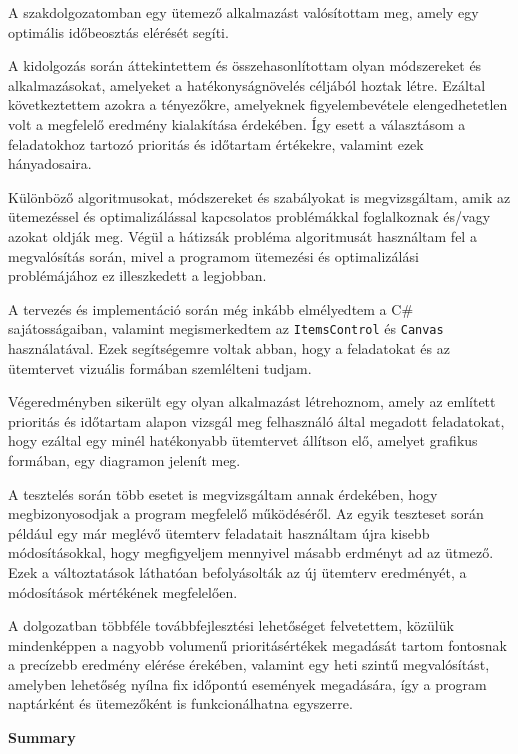 
A szakdolgozatomban egy ütemező alkalmazást valósítottam meg, amely egy optimális időbeosztás elérését segíti. 

A kidolgozás során áttekintettem és összehasonlítottam olyan módszereket és alkalmazásokat, amelyeket a hatékonyságnövelés céljából hoztak létre. Ezáltal következtettem azokra a tényezőkre, amelyeknek figyelembevétele elengedhetetlen volt a megfelelő eredmény kialakítása érdekében. Így esett a választásom a feladatokhoz tartozó prioritás és időtartam értékekre, valamint ezek hányadosaira.

Különböző algoritmusokat, módszereket és szabályokat is megvizsgáltam, amik az ütemezéssel és optimalizálással kapcsolatos problémákkal foglalkoznak és/vagy azokat oldják meg. Végül a hátizsák probléma algoritmusát használtam fel a megvalósítás során, mivel a programom ütemezési és optimalizálási problémájához ez illeszkedett a legjobban.

A tervezés és implementáció során még inkább elmélyedtem a C\# sajátosságaiban, valamint megismerkedtem az \texttt{ItemsControl} és \texttt{Canvas} használatával. Ezek segítségemre voltak abban, hogy a feladatokat és az ütemtervet vizuális formában szemlélteni tudjam.

Végeredményben sikerült egy olyan alkalmazást létrehoznom, amely az említett prioritás és időtartam alapon vizsgál meg felhasználó által megadott feladatokat, hogy ezáltal egy minél hatékonyabb ütemtervet állítson elő, amelyet grafikus formában, egy diagramon jelenít meg.

A tesztelés során több esetet is megvizsgáltam annak érdekében, hogy megbizonyosodjak a program megfelelő működéséről. Az egyik teszteset során például egy már meglévő ütemterv feladatait használtam újra kisebb módosításokkal, hogy megfigyeljem mennyivel másabb erdményt ad az ütmező. Ezek a változtatások láthatóan befolyásolták az új ütemterv eredményét, a módosítások mértékének megfelelően.

A dolgozatban többféle továbbfejlesztési lehetőséget felvetettem, közülük mindenképpen a nagyobb volumenű prioritásértékek megadását tartom fontosnak a precízebb eredmény elérése érekében, valamint egy heti szintű megvalósítást, amelyben lehetőség nyílna fix időpontú események megadására, így a program naptárként és ütemezőként is funkcionálhatna egyszerre.

\newpage
\begin{LARGE}
\textbf{Summary}
\end{LARGE}
\vskip 1cm

